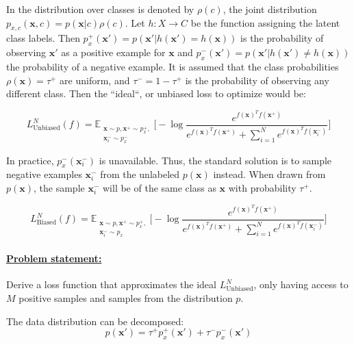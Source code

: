 \documentclass{article}
\begin{document}
In \citep{chuang2021debiased} the distribution over classes is denoted by $\rho(c)$, the joint distribution $p_{x,c}(\textbf{x}, c) = p(\textbf{x}|c)\rho(c)$. Let $h : X \rightarrow C$ be the function assigning the latent class labels. Then $p^+_x(\textbf{x}') = p(\textbf{x}'|h(\textbf{x}') = h(\textbf{x}))$ is the probability of observing $\textbf{x}'$ as a positive example for $\textbf{x}$ and $p^-_x(\textbf{x}') = p(\textbf{x}'|h(\textbf{x}') \neq h(\textbf{x}))$ the probability of a negative example. It is assumed that the class probabilities $\rho(\textbf{x}) = \tau^+$ are uniform, and $\tau^- = 1 - \tau^+$ is the probability of observing any different class. Then the  ``ideal``, or unbiased loss to optimize would be:

\begin{equation}  \label{eq:2}
L_{\text{Unbiased}}^N(f) = \mathbb{E}_{\substack{\textbf{x} \sim p, \textbf{x}^+ \sim p^+_x,\\ \textbf{x}_i^- \sim p_x^-}} \bigg[-\log \frac{e^{f(\textbf{x})^T f(\textbf{x}^+)}}{e^{f(\textbf{x})^T f(\textbf{x}^+)} + \sum _{i=1}^N e^{f(\textbf{x})^T f(\textbf{x}_i^-)}}\bigg]
\end{equation}

In practice, $p_x^-(\textbf{x}_i^-)$ is unavailable. Thus, the standard solution is to sample negative examples $\textbf{x}_i^-$ from the unlabeled $p(\textbf{x})$ instead. When drawn from $p(\textbf{x})$, the sample $\textbf{x}_i^-$ will be of the same class as $\textbf{x}$ with probability $\tau^+$.

\begin{equation} \label{eq:3}
L_{\text{Biased}}^N(f) = \mathbb{E}_{\substack{\textbf{x} \sim p, \textbf{x}^+ \sim p^+_x,\\ \textbf{x}_i^- \sim p_x}} \bigg[-\log \frac{e^{f(\textbf{x})^T f(\textbf{x}^+)}}{e^{f(\textbf{x})^T f(\textbf{x}^+)} + \sum _{i=1}^N e^{f(\textbf{x})^T f(\textbf{x}_i^-)}}\bigg]
\end{equation}

\paragraph{\underline{Problem statement:}} Derive a loss function that approximates the ideal $L_{\text{Unbiased}}^N$, only having access to $M$ positive samples and samples from the distribution $p$.

The data distribution can be decomposed:
\begin{equation} \label{eq:4}
p(\textbf{x}') = \tau^+ p^+_x(\textbf{x}') + \tau^-p_x^-(\textbf{x}')
\end{equation}
\end{document}
